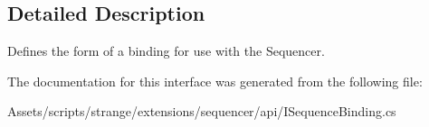 \subsection{Detailed Description}
Defines the form of a binding for use with the Sequencer. 

The documentation for this interface was generated from the following file\-:\begin{DoxyCompactItemize}
\item 
Assets/scripts/strange/extensions/sequencer/api/I\-Sequence\-Binding.\-cs\end{DoxyCompactItemize}
